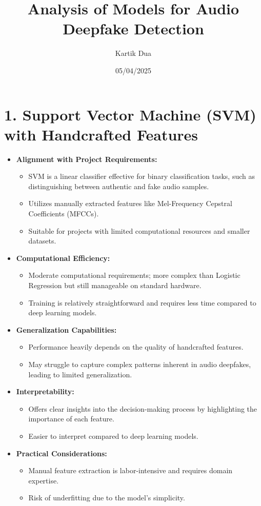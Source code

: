 \documentclass{article}
\title{Analysis of Models for Audio Deepfake Detection}
\author{Kartik Dua}
\date{05/04/2025}
\begin{document}
\maketitle

\section*{1. Support Vector Machine (SVM) with Handcrafted Features}

\begin{itemize}
    \item \textbf{Alignment with Project Requirements:}
    \begin{itemize}
        \item SVM is a linear classifier effective for binary classification tasks, such as distinguishing between authentic and fake audio samples.
        \item Utilizes manually extracted features like Mel-Frequency Cepstral Coefficients (MFCCs).
        \item Suitable for projects with limited computational resources and smaller datasets.
    \end{itemize}
    \item \textbf{Computational Efficiency:}
    \begin{itemize}
        \item Moderate computational requirements; more complex than Logistic Regression but still manageable on standard hardware.
        \item Training is relatively straightforward and requires less time compared to deep learning models.
    \end{itemize}
    \item \textbf{Generalization Capabilities:}
    \begin{itemize}
        \item Performance heavily depends on the quality of handcrafted features.
        \item May struggle to capture complex patterns inherent in audio deepfakes, leading to limited generalization.
    \end{itemize}
    \item \textbf{Interpretability:}
    \begin{itemize}
        \item Offers clear insights into the decision-making process by highlighting the importance of each feature.
        \item Easier to interpret compared to deep learning models.
    \end{itemize}
    \item \textbf{Practical Considerations:}
    \begin{itemize}
        \item Manual feature extraction is labor-intensive and requires domain expertise.
        \item Risk of underfitting due to the model's simplicity.
    \end{itemize}
\end{itemize}
\end{document}
